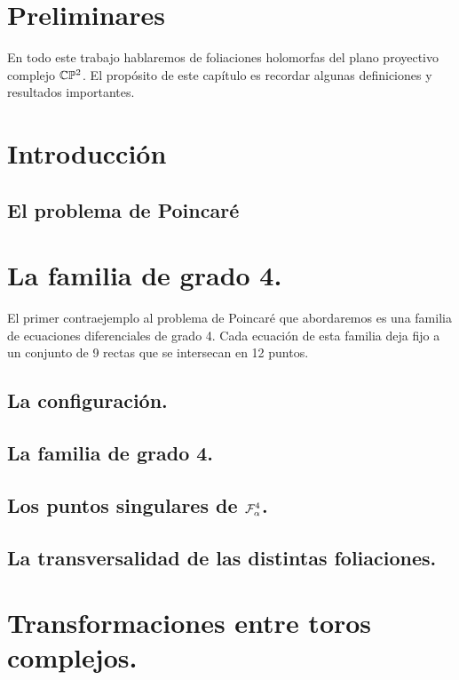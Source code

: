 \documentclass[10pt]{book}
\theoremstyle{definition}
\begin{document}
\tableofcontents
\chapter{Preliminares}

En todo este trabajo hablaremos de foliaciones holomorfas del plano proyectivo complejo $\CP$. El propósito de este capítulo es recordar algunas definiciones y resultados importantes.

     

\chapter{Introducción}

  \section{El problema de Poincaré}

    

\chapter{La familia de grado 4.}

El primer contraejemplo al problema de Poincaré que abordaremos es una familia de ecuaciones diferenciales de grado 4. Cada ecuación de esta familia deja fijo a un conjunto de 9 rectas que se intersecan en 12 puntos. 

	\section{La configuración.}

     	    

	\section{La familia de grado 4.}

     	    

  	\section{Los puntos singulares de $\Fol[4]{\alpha}$.}

     	       
     	    
     	    

        \section{La transversalidad de las distintas foliaciones.}

            

\appendix
\chapter{Transformaciones entre toros complejos.}
\label{ApendiceToros}        
            


\end{document}
